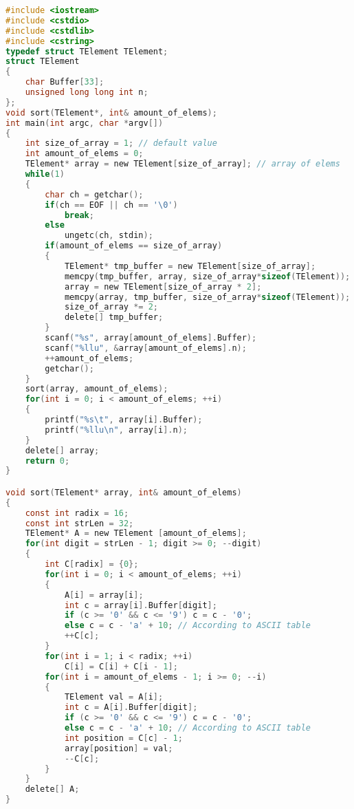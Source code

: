 \begin{lstlisting}[language=C]
#include <iostream>
#include <cstdio>
#include <cstdlib>
#include <cstring>
typedef struct TElement TElement;
struct TElement
{
    char Buffer[33];
    unsigned long long int n;
};
void sort(TElement*, int& amount_of_elems);
int main(int argc, char *argv[])
{
    int size_of_array = 1; // default value
    int amount_of_elems = 0;
    TElement* array = new TElement[size_of_array]; // array of elems
    while(1)
    {
        char ch = getchar();
        if(ch == EOF || ch == '\0')
            break;
        else
            ungetc(ch, stdin);
        if(amount_of_elems == size_of_array)
        {
            TElement* tmp_buffer = new TElement[size_of_array];
            memcpy(tmp_buffer, array, size_of_array*sizeof(TElement));
            array = new TElement[size_of_array * 2];
            memcpy(array, tmp_buffer, size_of_array*sizeof(TElement));
            size_of_array *= 2;
            delete[] tmp_buffer;
        }
        scanf("%s", array[amount_of_elems].Buffer);
        scanf("%llu", &array[amount_of_elems].n);
        ++amount_of_elems;
        getchar();
    }
    sort(array, amount_of_elems);
    for(int i = 0; i < amount_of_elems; ++i)
    {
        printf("%s\t", array[i].Buffer);
        printf("%llu\n", array[i].n);
    }
    delete[] array;
    return 0;
}

void sort(TElement* array, int& amount_of_elems)
{
    const int radix = 16;
    const int strLen = 32;
    TElement* A = new TElement [amount_of_elems];
    for(int digit = strLen - 1; digit >= 0; --digit)
    {
        int C[radix] = {0};
        for(int i = 0; i < amount_of_elems; ++i)
        {
            A[i] = array[i];
            int c = array[i].Buffer[digit];
            if (c >= '0' && c <= '9') c = c - '0';
            else c = c - 'a' + 10; // According to ASCII table
            ++C[c];
        }
        for(int i = 1; i < radix; ++i)
            C[i] = C[i] + C[i - 1];
        for(int i = amount_of_elems - 1; i >= 0; --i)
        {
            TElement val = A[i];
            int c = A[i].Buffer[digit];
            if (c >= '0' && c <= '9') c = c - '0';
            else c = c - 'a' + 10; // According to ASCII table
            int position = C[c] - 1;
            array[position] = val;
            --C[c];
        }
    }
    delete[] A;
}

	
\end{lstlisting}


